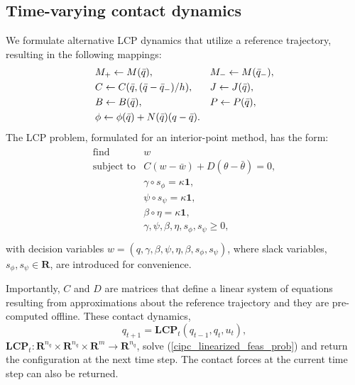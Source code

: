 \subsection{Time-varying contact dynamics}
We formulate alternative LCP dynamics that utilize a reference trajectory, resulting in the following mappings: 
\begin{align}
	&M_{+} \leftarrow M(\bar{q}), 
	&&M_{-} \leftarrow M(\bar{q}_{-}), \notag \\ 
	&C \leftarrow C(\bar{q}, (\bar{q} - \bar{q}_{-}) / h), 
	&&J \leftarrow J(\bar{q}),  \\ 
	&B \leftarrow B(\bar{q}), 
	&& P \leftarrow P(\bar{q}), \notag \\
	& \phi \leftarrow \phi(\bar{q}) + N(\bar{q}) (q - \bar{q}). \notag
\end{align}
The LCP problem, formulated for an interior-point method, has the form:
\begin{align}
	\begin{array}{ll}
		{\mbox{find}} & w \\
		\mbox{subject to} 
		& C (w - \bar{w}) + D (\theta - \bar{\theta}) = 0, \\
		& \gamma \circ s_{\phi}  = \kappa \textbf{1}, \\
		& \psi \circ s_{\psi} = \kappa \textbf{1}, \\
		& \beta \circ \eta = \kappa \textbf{1}, \\
		& \gamma, \psi, \beta, \eta, s_{\phi}, s_{\psi} \geq 0, \\
	\end{array} \label{cipc_linearized_feas_prob}
\end{align}
with decision variables $w = (q, \gamma, \beta, \psi, \eta, \beta, s_{\phi}, s_{\psi})$, where slack variables, $s_{\phi}, s_{\psi} \in \mathbf{R}$, are introduced for convenience.

Importantly, $C$ and $D$ are matrices that define a linear system of equations resulting from approximations about the reference trajectory and they are pre-computed offline. These contact dynamics,
\begin{equation}
	q_{t+1} = \textbf{LCP}_t(q_{t-1}, q_t, u_t), \label{cipc_lcp_q}
\end{equation}
$\textbf{LCP}_t : \mathbf{R}^{n_q} \times \mathbf{R}^{n_q} \times \mathbf{R}^m \rightarrow \mathbf{R}^{n_q}$, solve (\ref{cipc_linearized_feas_prob}) and return the configuration at the next time step. The contact forces at the current time step can also be returned.

